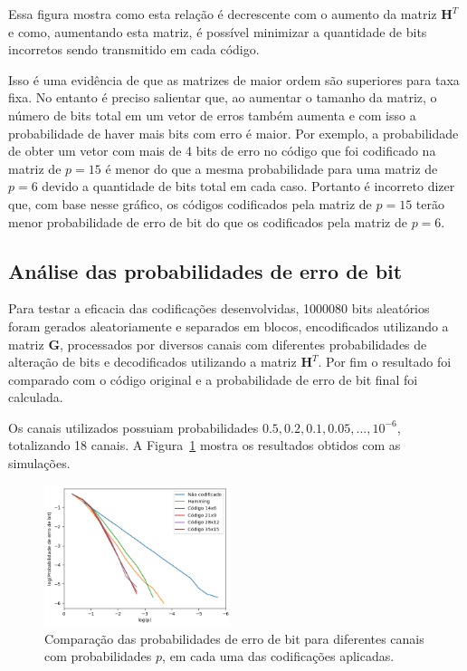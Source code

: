 Essa figura mostra como esta relação é decrescente com o aumento da matriz $\textbf{H}^T$ e como, aumentando esta matriz, é possível minimizar a quantidade de bits incorretos sendo transmitido em cada código.

Isso é uma evidência de que as matrizes de maior ordem são superiores para taxa fixa. No entanto é preciso salientar que, ao aumentar o tamanho da matriz, o número de bits total em um vetor de erros também aumenta e com isso a probabilidade de haver mais bits com erro é maior. Por exemplo, a probabilidade de obter um vetor com mais de 4 bits de erro no código que foi codificado na matriz de $p = 15$ é menor do que a mesma probabilidade para uma matriz de $p = 6$ devido a quantidade de bits total em cada caso. Portanto é incorreto dizer que, com base nesse gráfico, os códigos codificados pela matriz de $p = 15$ terão menor probabilidade de erro de bit do que os codificados pela matriz de $p = 6$.

\subsection{Análise das probabilidades de erro de bit}

Para testar a eficacia das codificações desenvolvidas, 1000080 bits aleatórios foram gerados aleatoriamente e separados em blocos, encodificados utilizando a matriz $\textbf{G}$, processados por diversos canais com diferentes probabilidades de alteração de bits e decodificados utilizando a matriz $\textbf{H}^T$. Por fim o resultado foi comparado com o código original e a probabilidade de erro de bit final foi calculada. 

Os canais utilizados possuiam probabilidades $0.5, 0.2, 0.1, 0.05, ..., 10^{-6}$, totalizando 18 canais. A Figura~\ref{fig:bit_error_probabilities} mostra os resultados obtidos com as simulações.

\begin{figure}[thpb]
  \centering
  \includegraphics[width=0.48\textwidth]{sections/bit_error_probabilities.png}
  \caption{Comparação das probabilidades de erro de bit para diferentes canais com probabilidades $p$, em cada uma das codificações aplicadas.}
  \label{fig:bit_error_probabilities}
\end{figure}

